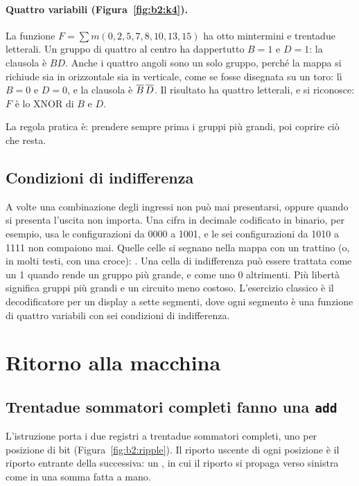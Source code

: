 \paragraph{Quattro variabili (Figura~\ref{fig:b2:k4}).} La funzione
$F=\sum m(0,2,5,7,8,10,13,15)$ ha otto mintermini e trentadue letterali. Un
gruppo di quattro al centro ha dappertutto $B=1$ e $D=1$: la clausola è $BD$.
Anche i quattro angoli sono un solo gruppo, perché la mappa si richiude sia in
orizzontale sia in verticale, come se fosse disegnata su un toro: lì $B=0$ e
$D=0$, e la clausola è $\overline{B}\,\overline{D}$. Il risultato ha quattro letterali,
e si riconosce: $F$ è lo XNOR di $B$ e $D$.

La regola pratica è: prendere sempre prima i gruppi più grandi, poi coprire ciò
che resta.

\subsection{Condizioni di indifferenza}

A volte una combinazione degli ingressi non può mai presentarsi, oppure quando
si presenta l'uscita non importa. Una cifra in decimale codificato in binario,
per esempio, usa le configurazioni da 0000 a 1001, e le sei configurazioni da
1010 a 1111 non compaiono mai. Quelle celle si segnano nella mappa con un
trattino (o, in molti testi, con una croce): 
. Una cella di indifferenza può essere trattata come un 1
quando rende un gruppo più grande, e come uno 0 altrimenti. Più libertà
significa gruppi più grandi e un circuito meno costoso. L'esercizio classico è
il decodificatore per un display a sette segmenti, dove ogni segmento è una
funzione di quattro variabili con sei condizioni di indifferenza.

\section{Ritorno alla macchina}

\subsection{Trentadue sommatori completi fanno una \texttt{add}}

L'istruzione  porta i due registri a trentadue sommatori
completi, uno per posizione di bit (Figura~\ref{fig:b2:ripple}). Il riporto
uscente di ogni posizione è il riporto entrante della successiva: un
 , in cui il
riporto si propaga verso sinistra come in una somma fatta a mano.


